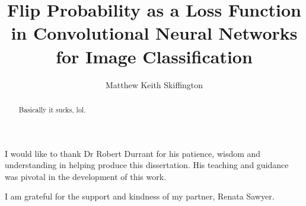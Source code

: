 \documentclass[12pt]{uwthesis17}
\title{Flip Probability as a Loss Function in Convolutional Neural Networks for Image Classification}
\author{Matthew Keith Skiffington}
\begin{document}
\maketitle
\setcounter{page}{2}

\setlength{\parindent}{0pt} %

\begin{abstract}
Basically it sucks, lol.
\end{abstract}
\begin{acknowledgements}

\bigskip

\begin{spacing}{2}

I would like to thank Dr Robert Durrant for his patience, wisdom and understanding in helping produce this dissertation. His teaching and guidance was pivotal in the development of this work.\bigskip

I am grateful for the support and kindness of my partner, Renata Sawyer.\bigskip

\end{spacing}

\end{acknowledgements}
\tableofcontents
\listoffigures
\listoftables
\newpage
{}
\setcounter{page}{1}








\end{document}
